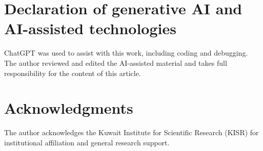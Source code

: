 \section*{Declaration of generative AI and AI-assisted technologies}
ChatGPT was used to assist with this work, including coding and debugging. The author reviewed and edited the AI-assisted material and takes full responsibility for the content of this article.

\section*{Acknowledgments}
The author acknowledges the Kuwait Institute for Scientific Research (KISR) for institutional affiliation and general research support.
